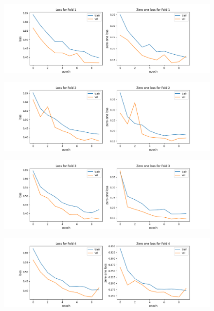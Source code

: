 \begin{appendices}
\begin{figure}[hbtp]
\centering
\includegraphics[scale=0.5]{../Images/cnn01_fold_1_zeroplot.png}
\end{figure}
\begin{figure}[hbtp]

\centering
\includegraphics[scale=0.5]{../Images/cnn01_fold_2_zeroplot.png}
\end{figure}
\begin{figure}[hbtp]

\centering
\includegraphics[scale=0.5]{../Images/cnn01_fold_3_zeroplot.png}
\end{figure}
\begin{figure}[hbtp]

\centering
\includegraphics[scale=0.5]{../Images/cnn01_fold_4_zeroplot.png}
\end{figure}
\begin{figure}[hbtp]


\end{figure}
\end{appendices}
